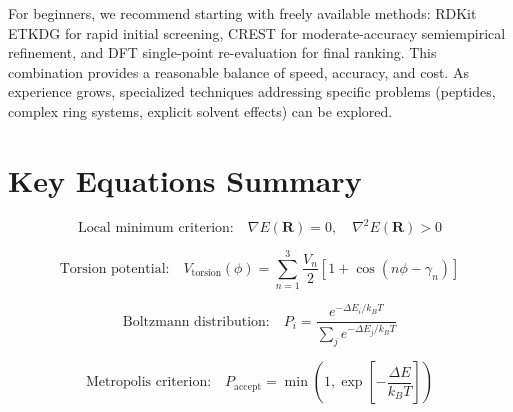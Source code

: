 \documentclass[12pt]{article}
\begin{document}
For beginners, we recommend starting with freely available methods: RDKit ETKDG for rapid initial screening, CREST for moderate-accuracy semiempirical refinement, and DFT single-point re-evaluation for final ranking. This combination provides a reasonable balance of speed, accuracy, and cost. As experience grows, specialized techniques addressing specific problems (peptides, complex ring systems, explicit solvent effects) can be explored.

\section*{Key Equations Summary}

\begin{equation}
\text{Local minimum criterion:} \quad \nabla E(\mathbf{R}) = 0, \quad \nabla^2 E(\mathbf{R}) > 0
\end{equation}

\begin{equation}
\text{Torsion potential:} \quad V_{\text{torsion}}(\phi) = \sum_{n=1}^{3} \frac{V_n}{2} \left[1 + \cos(n\phi - \gamma_n)\right]
\end{equation}

\begin{equation}
\text{Boltzmann distribution:} \quad P_i = \frac{e^{-\Delta E_i / k_B T}}{\sum_j e^{-\Delta E_j / k_B T}}
\end{equation}

\begin{equation}
\text{Metropolis criterion:} \quad P_{\text{accept}} = \min\left(1, \exp\left[-\frac{\Delta E}{k_B T}\right]\right)
\end{equation}
\end{document}
